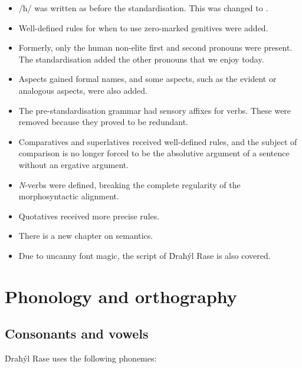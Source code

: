 \documentclass{book}
\begin{document}
\begin{itemize}
    \item /ħ/ was written as  before the standardisation. This was changed to .
    \item Well-defined rules for when to use zero-marked genitives were added.
    \item Formerly, only the human non-elite first and second pronouns were present. The standardisation added the other pronouns that we enjoy today.
    \item Aspects gained formal names, and some aspects, such as the evident or analogous aspects, were also added.
    \item The pre-standardisation grammar had sensory affixes for verbs. These were removed because they proved to be redundant.
    \item Comparatives and superlatives received well-defined rules, and the subject of comparison is no longer forced to be the absolutive argument of a sentence without an ergative argument.
    \item \emph{N}-verbs were defined, breaking the complete regularity of the morphosyntactic alignment.
    \item Quotatives received more precise rules.
    \item There is a new chapter on semantics.
    \item Due to uncanny font magic, the script of Ḋraħýl Rase
        is also covered.
\end{itemize}

\chapter{Phonology and orthography}

\section{Consonants and vowels}

Ḋraħýl Rase uses the following phonemes:
\end{document}
